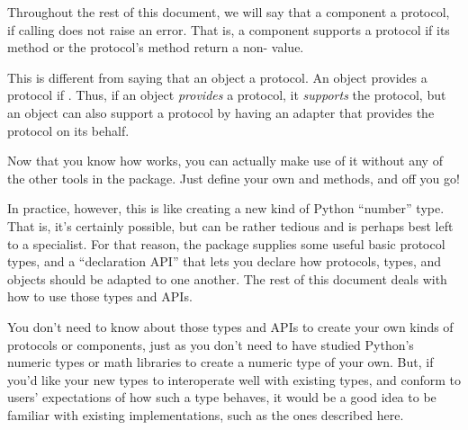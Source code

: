 \begin{verbatim%
}
\begin{verbatim%
}
Throughout the rest of this document, we will say that a component
 a protocol, if calling  does
not raise an error.  That is, a component supports a protocol if its
 method or the protocol's  method
return a non- value.

This is different from saying that an object  a protocol.  An
object provides a protocol if .  Thus,
if an object \emph{provides} a protocol, it \emph{supports} the protocol, but
an object can also support a protocol by having an adapter that provides the
protocol on its behalf.

Now that you know how  works, you can actually make use of it
without any of the other tools in the  package.  Just define
your own  and  methods, and off
you go!






In practice, however, this is like creating a new kind of Python ``number''
type.  That is, it's certainly possible, but can be rather tedious and is
perhaps best left to a specialist.  For that reason, the 
package supplies some useful basic protocol types, and a ``declaration API''
that lets you declare how protocols, types, and objects should be adapted to
one another.  The rest of this document deals with how to use those types and
APIs.

You don't need to know about those types and APIs to create your own kinds of
protocols or components, just as you don't need to have studied Python's
numeric types or math libraries to create a numeric type of your own.  But,
if you'd like your new types to interoperate well with existing types, and
conform to users' expectations of how such a type behaves, it would be a good
idea to be familiar with existing implementations, such as the ones described
here.



























\end{verbatim%
}
\end{verbatim%
}
